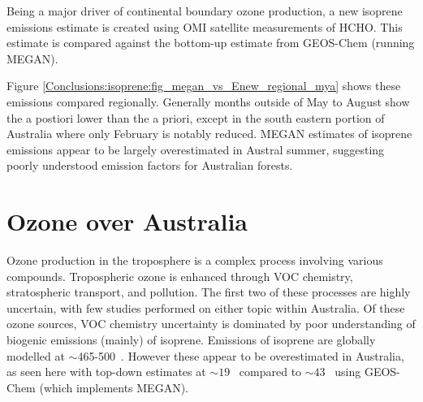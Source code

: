   Being a major driver of continental boundary ozone production, a new isoprene emissions estimate is created using OMI satellite measurements of HCHO.
  This estimate is compared against the bottom-up estimate from GEOS-Chem (running MEGAN).
  
  
  Figure \ref{Conclusions:isoprene:fig_megan_vs_Enew_regional_mya} shows these emissions compared regionally. 
  Generally months outside of May to August show the a postiori lower than the a priori, except in the south eastern portion of Australia where only February is notably reduced.
  MEGAN estimates of isoprene emissions appear to be largely overestimated in Austral summer, suggesting poorly understood emission factors for Australian forests.
  

\section{Ozone over Australia}
\label{Conclusions:ozone}
  
  Ozone production in the troposphere is a complex process involving various compounds.
  Tropospheric ozone is enhanced through VOC chemistry, stratospheric transport, and pollution.
  The first two of these processes are highly uncertain, with few studies performed on either topic within Australia.
  Of these ozone sources, VOC chemistry uncertainty is dominated by poor understanding of biogenic emissions (mainly) of isoprene.
  Emissions of isoprene are globally modelled at $\sim$465-500\tgcpyr  ~\parencite{Guenther2006, Messina2016}. 
  However these appear to be overestimated in Australia, as seen here with top-down estimates at $\sim 19$ \tgcpyr  ~compared to $\sim 43$ \tgcpyr  ~using GEOS-Chem (which implements MEGAN).
  
